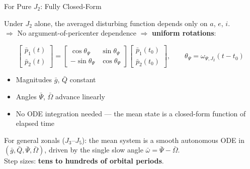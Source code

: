 \documentclass[aspectratio=169, 11pt]{beamer}
\begin{document}
\begin{frame}{For Pure $J_2$: Fully Closed-Form}

Under $J_2$ alone, the averaged disturbing function depends only on
$a$, $e$, $i$.\\
$\Rightarrow$ No argument-of-pericenter dependence $\Rightarrow$
\textbf{uniform rotations}:

\vspace{-0.3em}
\[
\begin{bmatrix} \bar p_1(t) \\ \bar p_2(t) \end{bmatrix}
= \begin{bmatrix}
\cos\theta_\Psi & \sin\theta_\Psi \\
-\sin\theta_\Psi & \cos\theta_\Psi
\end{bmatrix}
\begin{bmatrix} \bar p_1(t_0) \\ \bar p_2(t_0) \end{bmatrix},
\qquad
\theta_\Psi = \omega_{\Psi, J_2}(t - t_0)
\]

\vspace{-0.2em}
\begin{itemize}\setlength{\itemsep}{0.1em}
    \item Magnitudes $\bar g$, $\bar Q$ constant
    \item Angles $\bar\Psi$, $\bar\Omega$ advance linearly
    \item No ODE integration needed --- \alert{the mean state is a
          closed-form function of elapsed time}
\end{itemize}

\vspace{0.3em}
For general zonals ($J_3$--$J_5$): the mean system is a smooth
autonomous ODE in $(\bar g, \bar Q, \bar\Psi, \bar\Omega)$, driven by
the single slow angle $\bar\omega = \bar\Psi - \bar\Omega$.\\[0.2em]
Step sizes: \textbf{tens to hundreds of orbital periods}.

\end{frame}
\end{document}
